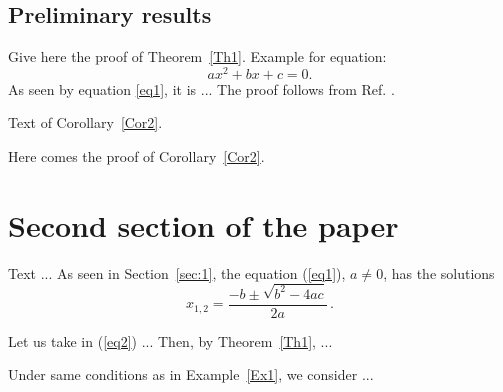 \documentclass[twoside,reqno,11pt]{fcaa}
\begin{document}
   \vspace*{-12pt} %
 \subsection{Preliminary results}\label{subsec:1.1}


 \proof %
 Give here the proof of Theorem~\ref{Th1}. Example for
equation:
\begin{equation}\label{eq1}
ax^2+bx +c =0.
\end{equation}
 As seen by equation \eqref{eq1}, it is ...
 The proof follows from Ref. \cite{Moak}.
 \proofend %

 \begin{corollary}\label{Cor2}
Text of Corollary~\ref{Cor2}.
 \end{corollary}

 \proof
 Here comes the proof of Corollary~\ref{Cor2}.
 \proofend

\section{Second section of the paper}\label{sec:2}

\setcounter{section}{2}
\setcounter{equation}{0}\setcounter{theorem}{0}


 Text ... As seen in Section~\ref{sec:1}, the equation
(\ref{eq1}), $ a\neq 0$, has the solutions
 \begin{equation}\label{eq2}
 x_{1,2}= {\frac {-b \pm \sqrt{b^2-4ac}}{2a}}\,.
 \end{equation}

 \begin{example}\label{Ex1}
 Let us take in (\ref{eq2}) ... Then, by Theorem~\ref{Th1}, ...
 \end{example}

 \begin{example}\label{Ex2}
 Under same conditions as in Example~\ref{Ex1}, we consider ...
 \end{example}
\end{document}
